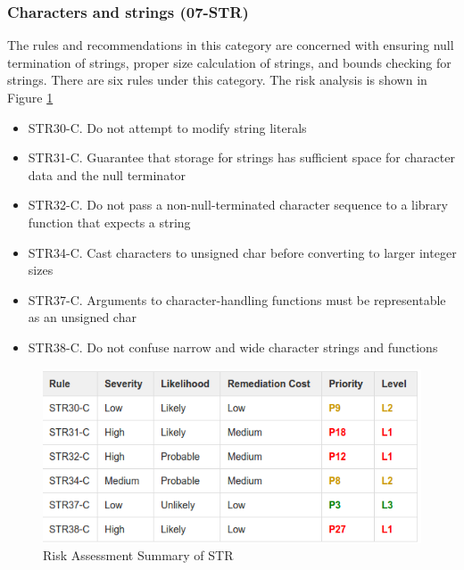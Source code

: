 \subsubsection{Characters and strings (07-STR)} The rules and recommendations in this category are concerned with ensuring null termination of strings, proper size calculation of strings, and bounds checking for strings. There are six rules under this category. The risk analysis is shown in Figure \ref{fig:8}\cite{cert-c}
\begin{itemize}
	\item STR30-C. Do not attempt to modify string literals
	
	\item STR31-C. Guarantee that storage for strings has sufficient space for character data and the null terminator
	
	\item STR32-C. Do not pass a non-null-terminated character sequence to a library function that expects a string
	
	\item STR34-C. Cast characters to unsigned char before converting to larger integer sizes
	
	\item STR37-C. Arguments to character-handling functions must be representable as an unsigned char
	
	\item STR38-C. Do not confuse narrow and wide character strings and functions
\end{itemize}
\begin{figure}[H]
	
	
	\centering
	\includegraphics[width=.6\linewidth]{Figures/str}
	\caption{Risk Assessment Summary of STR}
	\label{fig:8}
	
\end{figure}
